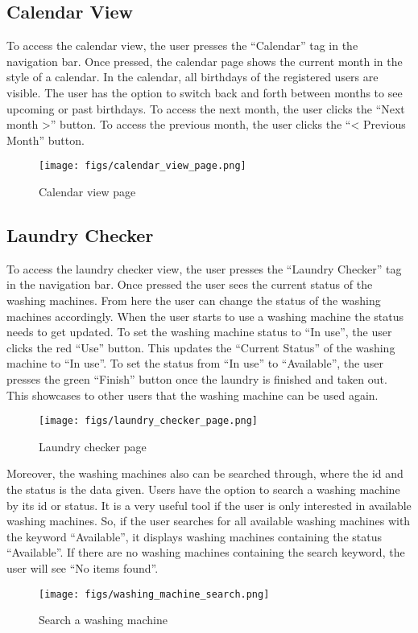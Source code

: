 \documentclass[conference]{IEEEtran}
\begin{document}
\subsection{Calendar View}
To access the calendar view, the user presses the “Calendar” tag in the navigation bar. Once pressed, the calendar page shows the current month in the style of a calendar. In the calendar, all birthdays of the registered users are visible. The user has the option to switch back and forth between months to see upcoming or past birthdays. To access the next month, the user clicks the “Next month >” button. To access the previous month, the user clicks the “< Previous Month” button.
\begin{figure}[H]
\centering
\texttt{[image: figs/calendar\_view\_page.png]}
\caption{Calendar view page}
\label{fig:Calendar view page}
\end{figure}
\subsection{Laundry Checker}
To access the laundry checker view, the user presses the “Laundry Checker” tag in the navigation bar. Once pressed the user sees the current status of the washing machines. From here the user can change the status of the washing machines accordingly. When the user starts to use a washing machine the status needs to get updated. To set the washing machine status to “In use”, the user clicks the red “Use” button. This updates the “Current Status” of the washing machine to “In use”. To set the status from “In use” to “Available”, the user presses the green “Finish” button once the laundry is finished and taken out. This showcases to other users that the washing machine can be used again.
\begin{figure}[H]
\centering
\texttt{[image: figs/laundry\_checker\_page.png]}
\caption{Laundry checker page}
\label{fig:Laundry checker page}
\end{figure}
Moreover, the washing machines also can be searched through, where the id and the status is the data given. Users have the option to search a washing machine by its id or status. It is a very useful tool if the user is only interested in available washing machines. So, if the user searches for all available washing machines with the keyword “Available”, it displays washing machines containing the status “Available”. If there are no washing machines containing the search keyword, the user will see “No items found”.
\begin{figure}[H]
\centering
\texttt{[image: figs/washing\_machine\_search.png]}
\caption{Search a washing machine}
\label{fig:Search a washing machine}
\end{figure}
\end{document}
